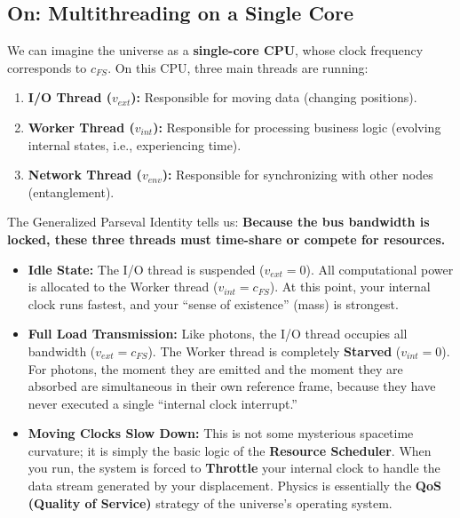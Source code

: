 \documentclass[11pt,a4paper,twoside]{book}
\begin{document}
\subsection{On: Multithreading on a Single Core}

We can imagine the universe as a \textbf{single-core CPU}, whose clock frequency corresponds to \textbf{$c_{FS}$}. On this CPU, three main threads are running:

\begin{enumerate}
\item \textbf{I/O Thread ($v_{ext}$):} Responsible for moving data (changing positions).

\item \textbf{Worker Thread ($v_{int}$):} Responsible for processing business logic (evolving internal states, i.e., experiencing time).

\item \textbf{Network Thread ($v_{env}$):} Responsible for synchronizing with other nodes (entanglement).
\end{enumerate}

The Generalized Parseval Identity tells us: \textbf{Because the bus bandwidth is locked, these three threads must time-share or compete for resources.}

\begin{itemize}
\item \textbf{Idle State:} The I/O thread is suspended (\textbf{$v_{ext}=0$}). All computational power is allocated to the Worker thread (\textbf{$v_{int}=c_{FS}$}). At this point, your internal clock runs fastest, and your ``sense of existence'' (mass) is strongest.

\item \textbf{Full Load Transmission:} Like photons, the I/O thread occupies all bandwidth (\textbf{$v_{ext}=c_{FS}$}). The Worker thread is completely \textbf{Starved} (\textbf{$v_{int}=0$}). For photons, the moment they are emitted and the moment they are absorbed are simultaneous in their own reference frame, because they have never executed a single ``internal clock interrupt.''

\item \textbf{Moving Clocks Slow Down:} This is not some mysterious spacetime curvature; it is simply the basic logic of the \textbf{Resource Scheduler}. When you run, the system is forced to \textbf{Throttle} your internal clock to handle the data stream generated by your displacement. Physics is essentially the \textbf{QoS (Quality of Service)} strategy of the universe's operating system.
\end{itemize}
\end{document}
